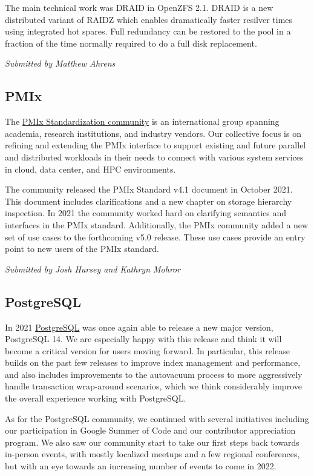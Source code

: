 \documentclass[a4paper]{report}
\begin{document}
The main technical work was DRAID in OpenZFS 2.1. DRAID is a new distributed variant of RAIDZ which enables dramatically faster resilver times using integrated hot spares. Full redundancy can be restored to the pool in a fraction of the time normally required to do a full disk replacement.

{\em Submitted by Matthew Ahrens}

\subsection{PMIx}

The \href{https://pmix.github.io/}{PMIx Standardization community} is an international group spanning academia, research institutions, and industry vendors. Our collective focus is on refining and extending the PMIx interface to support existing and future parallel and distributed workloads in their needs to connect with various system services in cloud, data center, and HPC environments.

The community released the PMIx Standard v4.1 document in October 2021. This document includes clarifications and a new chapter on storage hierarchy inspection. In 2021 the community worked hard on clarifying semantics and interfaces in the PMIx standard.  Additionally, the PMIx community added a new set of use cases to the forthcoming v5.0 release. These use cases provide an entry point to new users of the PMIx standard.

{\em Submitted by Josh Hursey and Kathryn Mohror}

\subsection{PostgreSQL}

In 2021 \href{https://www.postgresql.org/}{PostgreSQL} was once again able to release a new major version, PostgreSQL 14. We are especially happy with this release and think it will become a critical version for users moving forward. In particular, this release builds on the past few releases to improve index management and performance, and also includes improvements to the autovacuum process to more aggressively handle transaction wrap-around scenarios, which we think considerably improve the overall experience working with PostgreSQL.

As for the PostgreSQL community, we continued with several initiatives including our participation in Google Summer of Code and our contributor appreciation program. We also saw our community start to take our first steps back towards in-person events, with mostly localized meetups and a few regional conferences, but with an eye towards an increasing number of events to come in 2022.
\end{document}
